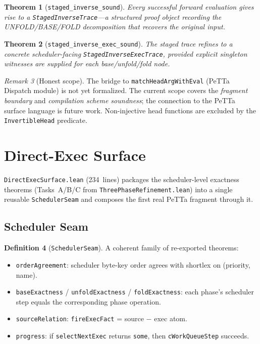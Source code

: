 \documentclass[11pt]{article}
\newtheorem{theorem}{Theorem}[section]
\theoremstyle{definition}
\newtheorem{definition}[theorem]{Definition}
\theoremstyle{remark}
\newtheorem{remark}[theorem]{Remark}
\begin{document}
\begin{theorem}[\texttt{staged\_inverse\_sound}]
Every successful forward evaluation gives rise to a
\texttt{StagedInverseTrace}---a structured proof object recording the
UNFOLD/BASE/FOLD decomposition that recovers the original input.
\end{theorem}

\begin{theorem}[\texttt{staged\_inverse\_exec\_sound}]
The staged trace refines to a concrete scheduler-facing
\texttt{StagedInverseExecTrace}, provided explicit singleton witnesses
are supplied for each base/unfold/fold node.
\end{theorem}

\begin{remark}[Honest scope]
The bridge to \texttt{matchHeadArgWithEval} (PeTTa Dispatch module) is
not yet formalized.  The current scope covers the \emph{fragment boundary}
and \emph{compilation scheme soundness}; the connection to the PeTTa
surface language is future work.  Non-injective head functions are
excluded by the \texttt{InvertibleHead} predicate.
\end{remark}

\section{Direct-Exec Surface}
\label{sec:directexec}

\texttt{DirectExecSurface.lean} (234~lines) packages the scheduler-level
exactness theorems (Tasks~A/B/C from \texttt{ThreePhaseRefinement.lean})
into a single reusable \texttt{SchedulerSeam} and composes the first
real PeTTa fragment through it.

\subsection{Scheduler Seam}

\begin{definition}[\texttt{SchedulerSeam}]
A coherent family of re-exported theorems:
\begin{itemize}[nosep]
  \item \texttt{orderAgreement}: scheduler byte-key order agrees with
        shortlex on (priority, name).
  \item \texttt{baseExactness} / \texttt{unfoldExactness} /
        \texttt{foldExactness}: each phase's scheduler step equals the
        corresponding phase operation.
  \item \texttt{sourceRelation}: \texttt{fireExecFact} = source $-$ exec
        atom.
  \item \texttt{progress}: if \texttt{selectNextExec} returns \texttt{some},
        then \texttt{cWorkQueueStep} succeeds.
\end{itemize}
\end{definition}
\end{document}
